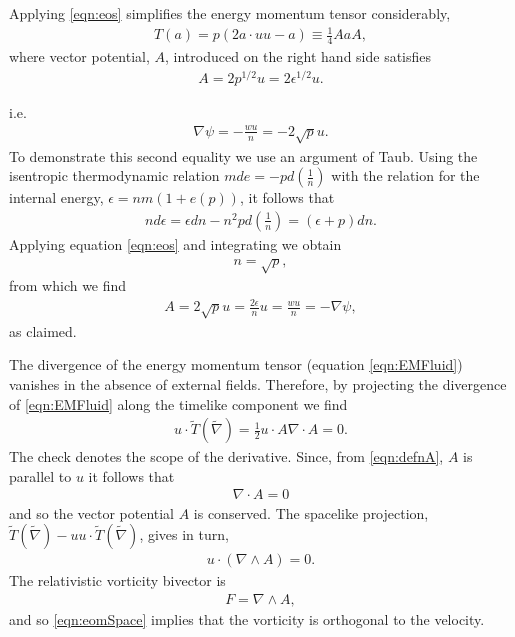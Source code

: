 \documentclass[10pt, fleqn,final,showtrims,oldfontcommands]{article} %
\newcommand{\eqa}[1]{\begin{align}#1\end{align}}
\newcommand{\eqal}[2]{\begin{align}#1\label{eqn:#2}\end{align}}
\newcommand{\eqnref}[1]{\ref{eqn:#1}}
\newcommand{\lr}[1]{\left( #1 \right)}
\newcommand{\del}{\nabla}
\newcommand{\scope}[1]{\tilde{#1}}
\newcommand{\half}{\tfrac{1}{2}}
\begin{document}



Applying \eqnref{eos} simplifies the energy momentum tensor considerably,
\eqal{
  T(a) =  p\lr{2 a \cdot u u  - a} \equiv  \frac{1}{4}  A a A,
}{EMFluid}
where vector potential, $A$, introduced on the right hand side satisfies
\eqal{
  A = 2p^{1/2}u =2 \epsilon^{1/2} u.
}{defnA}

i.e.
\begin{align}
  \del \psi = - \frac{wu}{n} = - 2\sqrt p u.
\end{align}
To demonstrate this second equality we  use an argument of Taub\cite{Taub1978}.
Using the isentropic thermodynamic relation $m de = - p d\lr{\frac{1}{n}}$ with the relation for the internal energy, $\epsilon= nm( 1 + e(p))$,
it follows that 
\begin{align}
 n d\epsilon = \epsilon dn - n^2 p d \lr{\frac{1}{n}} = \lr{\epsilon + p} dn.
\end{align}
Applying equation \eqnref{eos} and integrating we obtain
\begin{align}
  n = \sqrt p, \label{eqn:nrootp}
\end{align}
from which we find
\begin{align}
A = 2\sqrt p  u = \frac{2\epsilon}{n} u = \frac{wu}{n} =  - \del \psi,
\end{align}
as claimed.


The divergence of the energy momentum tensor (equation \eqnref{EMFluid}) vanishes in the absence of external fields.
Therefore, by projecting the divergence of \eqnref{EMFluid} along the timelike component we find
\eqa{
  u\cdot\scope T(\scope\del)= \half  u\cdot A \del \cdot A = 0.
}
The check denotes the scope of the derivative.
Since, from \eqnref{defnA}, $A$ is parallel to $u$  it follows that 
\eqal{
  \del \cdot A  =0
}{eomTime}
and so the vector potential $A$ is conserved.
The spacelike projection, $\scope T(\scope \del) - u u\cdot \scope T(\scope\del)$, gives in turn,
\eqal{
  u \cdot \lr{\del \wedge A} = 0.
}{eomSpace}
The relativistic vorticity bivector is 
\eqal{F = \del \wedge A,}{DefnVorticity}
and so \eqnref{eomSpace} implies that the vorticity is orthogonal to the velocity.
\end{document}
